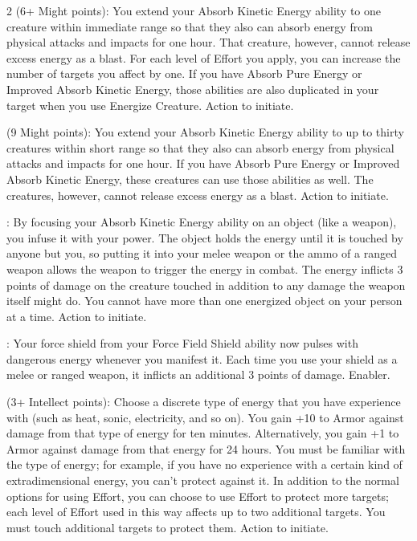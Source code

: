 \begin{multicols}{2}
 (6+ Might points): You extend your Absorb Kinetic Energy ability to one creature within immediate range so that they also can absorb energy from physical attacks and impacts for one hour. That creature, however, cannot release excess energy as a blast. For each level of Effort you apply, you can increase the number of targets you affect by one. If you have Absorb Pure Energy or Improved Absorb Kinetic Energy, those abilities are also duplicated in your target when you use Energize Creature. Action to initiate. 
 
 (9 Might points): You extend your Absorb Kinetic Energy ability to up to thirty creatures within short range so that they also can absorb energy from physical attacks and impacts for one hour. If you have Absorb Pure Energy or Improved Absorb Kinetic Energy, these creatures can use those abilities as well. The creatures, however, cannot release excess energy as a blast. Action to initiate. 
 
: By focusing your Absorb Kinetic Energy ability on an object (like a weapon), you infuse it with your power. The object holds the energy until it is touched by anyone but you, so putting it into your melee weapon or the ammo of a ranged weapon allows the weapon to trigger the energy in combat. The energy inflicts 3 points of damage on the creature touched in addition to any damage the weapon itself might do. You cannot have more than one energized object on your person at a time. Action to initiate. 
 
: Your force shield from your Force Field Shield ability  now pulses with dangerous energy whenever you manifest it. Each time you use your shield as a melee or ranged weapon, it inflicts an additional 3 points of damage. Enabler. 
 
 (3+ Intellect points): Choose a discrete type of energy that you have experience with (such as heat, sonic, electricity, and so on). You gain +10 to Armor against damage from that type of energy for ten minutes. Alternatively, you gain +1 to Armor against damage from that energy for 24 hours. You must be familiar with the type of energy; for example, if you have no experience with a certain kind of extradimensional energy, you can’t protect against it. In addition to the normal options for using Effort, you can choose to use Effort to protect more targets; each level of Effort used in this way affects up to two additional targets. You must touch additional targets to protect them. Action to initiate. 
 

\end{multicols}
